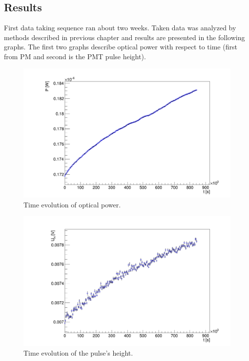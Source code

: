 \subsection{Results}
First data taking sequence ran about two weeks. Taken data was analyzed by methods described in previous chapter and results are presented in the following graphs. The first two graphs describe 
optical power with respect to time (first from PM and second is the PMT pulse height).
\begin{figure}[H]
 \centering
 \includegraphics[scale=0.3]{./pictures/powers}
 \caption{Time evolution of optical power.}
 \label{pow1}
\end{figure}



\begin{figure}[H]
 \centering
 \includegraphics[scale=0.3]{./pictures/Height}
 \caption{Time evolution of the pulse's height.}
 \label{height1}
\end{figure}

